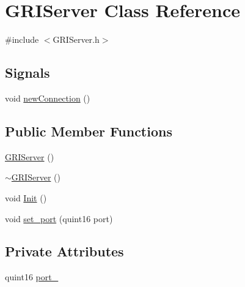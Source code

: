 \hypertarget{classGRIServer}{\section{\-G\-R\-I\-Server \-Class \-Reference}
\label{classGRIServer}
}


{\ttfamily \#include $<$\-G\-R\-I\-Server.\-h$>$}

\subsection*{\-Signals}
\begin{DoxyCompactItemize}
\item 
void \hyperlink{classGRIServer_ab0d5fdef5e0df2d968e98153fd40a819}{new\-Connection} ()
\end{DoxyCompactItemize}
\subsection*{\-Public \-Member \-Functions}
\begin{DoxyCompactItemize}
\item 
\hyperlink{classGRIServer_a08e3b96ca70c246468d30e2d3edcbe94}{\-G\-R\-I\-Server} ()
\item 
\hyperlink{classGRIServer_a4781336228d55c1d6d436d75204a4a6e}{$\sim$\-G\-R\-I\-Server} ()
\item 
void \hyperlink{classGRIServer_a28af178cd6bce43022e7ec56574ee516}{\-Init} ()
\item 
void \hyperlink{classGRIServer_aa1f8b0b4a20bae60fe343c431bfa17be}{set\-\_\-port} (quint16 port)
\end{DoxyCompactItemize}
\subsection*{\-Private \-Attributes}
\begin{DoxyCompactItemize}
\item 
quint16 \hyperlink{classGRIServer_a35403d96a76610c6ac6badc455039643}{port\-\_\-}
\end{DoxyCompactItemize}


